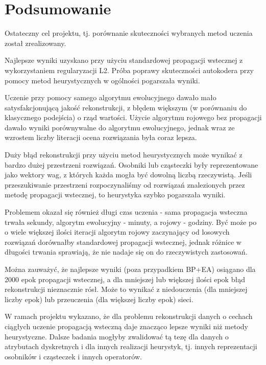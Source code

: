 \documentclass[11pt,a4paper,oneside]{report}
\begin{document}
\chapter{Podsumowanie}

Ostateczny cel projektu, tj. porównanie skuteczności wybranych metod uczenia został zrealizowany.

Najlepsze wyniki uzyskano przy użyciu standardowej propagacji wstecznej z wykorzystaniem regularyzacji L2. 
Próba poprawy skuteczności autokodera przy pomocy metod heurystycznych w ogólności pogarszała wyniki. 

Uczenie przy pomocy samego algorytmu ewolucyjnego dawało mało satysfakcjonującą jakość rekonstrukcji, z błędem większym (w porównaniu do klasycznego podejścia) o rząd wartości. 
Użycie algorytmu rojowego bez propagacji dawało wyniki porównywalne do algorytmu ewolucyjnego, jednak wraz ze wzrostem liczby literacji ocena rozwiązania była coraz lepsza. 

Duży błąd rekonstrukcji przy użyciu metod heurystycznych może wynikać z bardzo dużej przestrzeni rozwiązań. 
Osobniki lub cząsteczki były reprezentowane jako wektory wag, z których każda mogła być dowolną liczbą rzeczywistą.
Jeśli przeszukiwanie przestrzeni rozpoczynaliśmy od rozwiązań znalezionych przez metodę propagacji wstecznej, to heurystyka szybko pogarszała wyniki.

Problemem okazał się również długi czas uczenia - sama propagacja wsteczna trwała sekundy, algorytm ewolucyjny - minuty, a rojowy - godziny. 
Być może po o wiele większej ilości iteracji algorytm rojowy zaczynający od losowych rozwiązań dorównałby standardowej propagacji wstecznej, jednak różnice w długości trwania sprawiają, że nie nadaje się on do rzeczywistych zastosowań.

Można zauważyć, że najlepsze wyniki (poza przypadkiem BP+EA) osiągano dla 2000 epok propagacji wstecznej, a dla mniejszej lub większej ilości epok błąd rekonstrukcji nieznacznie rósł. 
Może to wynikać z niedouczenia (dla mniejszej liczby epok) lub przeuczenia (dla większej liczby epok) sieci.

W ramach projektu wykazano, że dla problemu rekonstrukcji danych o cechach ciągłych uczenie propagacją wsteczną daje znacząco lepsze wyniki niż metody heurystyczne. 
Dalsze badania mogłyby zwalidować tą tezę dla danych o atrybutach dyskretnych i dla innych realizacji heurystyk, tj. innych reprezentacji osobników i cząsteczek i innych operatorów.



\end{document}
